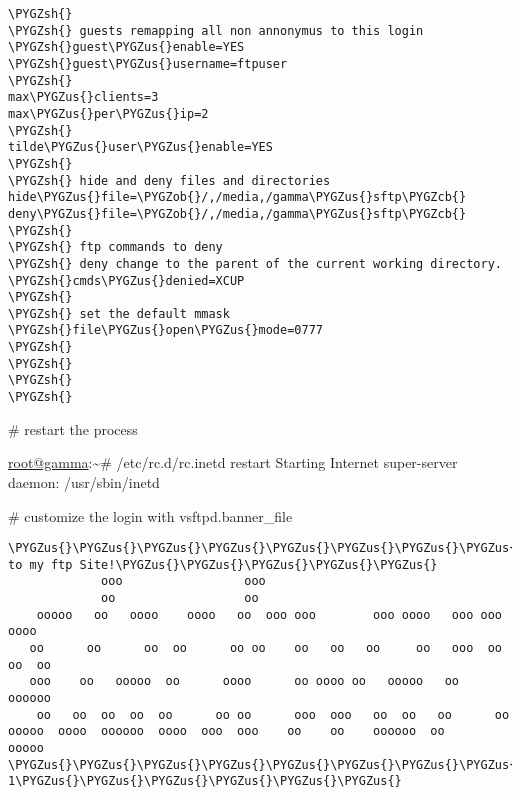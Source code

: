 \documentclass[letterpaper,10pt,english]{sphinxmanual}
\def\PYGZus{\char`\_}
\def\PYGZob{\char`\{}
\def\PYGZcb{\char`\}}
\def\PYGZsh{\char`\#}
\begin{document}
\begin{Verbatim}[commandchars=\\\{\}]
\PYGZsh{}
\PYGZsh{} guests remapping all non annonymus to this login
\PYGZsh{}guest\PYGZus{}enable=YES
\PYGZsh{}guest\PYGZus{}username=ftpuser
\PYGZsh{}
max\PYGZus{}clients=3
max\PYGZus{}per\PYGZus{}ip=2
\PYGZsh{}
tilde\PYGZus{}user\PYGZus{}enable=YES
\PYGZsh{}
\PYGZsh{} hide and deny files and directories
hide\PYGZus{}file=\PYGZob{}/,/media,/gamma\PYGZus{}sftp\PYGZcb{} 
deny\PYGZus{}file=\PYGZob{}/,/media,/gamma\PYGZus{}sftp\PYGZcb{} 
\PYGZsh{}
\PYGZsh{} ftp commands to deny 
\PYGZsh{} deny change to the parent of the current working directory.
\PYGZsh{}cmds\PYGZus{}denied=XCUP
\PYGZsh{}
\PYGZsh{} set the default mmask
\PYGZsh{}file\PYGZus{}open\PYGZus{}mode=0777
\PYGZsh{}
\PYGZsh{}
\PYGZsh{}
\PYGZsh{}
\end{Verbatim}

\# restart the process

\href{mailto:root@gamma}{root@gamma}:\textasciitilde{}\# /etc/rc.d/rc.inetd restart
Starting Internet super-server daemon:  /usr/sbin/inetd

\# customize the login with vsftpd.banner\_file

\begin{Verbatim}[commandchars=\\\{\}]
      \PYGZus{}\PYGZus{}\PYGZus{}\PYGZus{}\PYGZus{}\PYGZus{}\PYGZus{}\PYGZus{}\PYGZus{}\PYGZus{}\PYGZus{}\PYGZus{}\PYGZus{}\PYGZus{}\PYGZus{}\PYGZus{}\PYGZus{}\PYGZus{}\PYGZus{}\PYGZus{}\PYGZus{}\PYGZus{}\PYGZus{}\PYGZus{}\PYGZus{}\PYGZus{}\PYGZus{}\PYGZus{}\PYGZus{}\PYGZus{}\PYGZus{}\PYGZus{}\PYGZus{}\PYGZus{}\PYGZus{}\PYGZus{}\PYGZus{}\PYGZus{}\PYGZus{}\PYGZus{}\PYGZus{}\PYGZus{}\PYGZus{}\PYGZus{}Welcome to my ftp Site!\PYGZus{}\PYGZus{}\PYGZus{}\PYGZus{}\PYGZus{}
             ooo                 ooo
             oo                  oo
    ooooo   oo   oooo    oooo   oo  ooo ooo        ooo oooo   ooo ooo   oooo
   oo      oo      oo  oo      oo oo    oo   oo   oo     oo   ooo  oo oo  oo
   ooo    oo   ooooo  oo      oooo      oo oooo oo   ooooo   oo      oooooo
    oo   oo  oo  oo  oo      oo oo      ooo  ooo   oo  oo   oo      oo
ooooo  oooo  oooooo  oooo  ooo  ooo    oo    oo    oooooo  oo       ooooo
\PYGZus{}\PYGZus{}\PYGZus{}\PYGZus{}\PYGZus{}\PYGZus{}\PYGZus{}\PYGZus{}\PYGZus{}\PYGZus{}\PYGZus{}\PYGZus{}\PYGZus{}\PYGZus{}\PYGZus{}\PYGZus{}\PYGZus{}\PYGZus{}\PYGZus{}\PYGZus{}\PYGZus{}\PYGZus{}\PYGZus{}\PYGZus{}\PYGZus{}\PYGZus{}\PYGZus{}\PYGZus{}\PYGZus{}\PYGZus{}\PYGZus{}\PYGZus{}\PYGZus{}\PYGZus{}\PYGZus{}\PYGZus{}\PYGZus{}\PYGZus{}\PYGZus{}\PYGZus{}\PYGZus{}\PYGZus{}\PYGZus{}\PYGZus{}\PYGZus{}\PYGZus{}\PYGZus{}\PYGZus{}\PYGZus{}\PYGZus{}\PYGZus{}\PYGZus{}\PYGZus{}\PYGZus{}\PYGZus{}\PYGZus{}\PYGZus{}\PYGZus{}\PYGZus{}\PYGZus{}\PYGZus{}User 1\PYGZus{}\PYGZus{}\PYGZus{}\PYGZus{}\PYGZus{}\PYGZus{}
\end{Verbatim}
\end{document}
